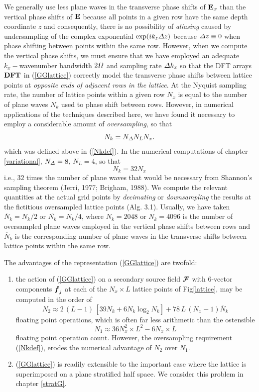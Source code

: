 We generally use less plane waves in the transverse phase shifts of ${\bf E}_{x}$
than the vertical phase shifts of ${\bf E}$ because all points in a 
given row have the same depth coordinate $z$ and consequently, there is no possibility of 
{\em aliasing\/}
caused by 
undersampling of the complex exponential $\exp (i k_z {\mit \Delta}z)$ 
because ${\mit \Delta}z\equiv 0$ when phase shifting between points 
within the same row. However, when we compute the vertical phase shifts, 
we must ensure that we have employed an adequate $k_x-$wavenumber 
bandwidth $2 {\mit \Omega}$ and sampling rate ${\mit \Delta}k_x$ so that the DFT arrays 
${\bf DFT}$ in (\ref{GGlattice}) correctly model the transverse phase shifts between 
lattice points at {\em opposite ends  of  adjacent rows in the 
lattice\/}. 
At the Nyquist sampling rate, the number of lattice points within a given 
row $N_x$ is equal to the number of plane waves $N_k$ used to phase shift between 
rows.
 However, in numerical applications of the techniques described 
here, we have found it necessary to employ a considerable amount of 
{\em oversampling\/}, so that
\[
N_k = {N}_{\mit \Delta } {N}_{L } N_x.
\]
which was defined above in (\ref{Nkdef}). In the numerical computations 
of chapter \ref{variational}, ${N}_{\mit \Delta }=8$, ${N}_{L }=4$, so that
\[
N_k = 32  N_x
\]
i.e., $32$ times the number of plane 
waves that would be necessary from Shannon's sampling theorem (Jerri, 1977; Brigham, 1988). 
We compute 
the relevant quantities at the actual grid points by {\em decimating\/} 
or {\em downsampling\/} 
the results at the fictitious oversampled lattice points (Alg. 3.1).
Usually, we have taken $\overline{N}_k=N_k/2$ or $\overline{N_k}=N_k/4$, where 
$N_k=2048$ or $N_k=4096$ is the number of oversampled plane waves 
employed in the vertical phase shifts between rows and $\overline{N}_k$ is the 
corresponding number of plane waves in the transverse shifts between 
lattice points within the same row.

The advantages of the representation (\ref{GGlattice}) are twofold:
\begin{enumerate}
\item the action of (\ref{GGlattice}) on a secondary source field 
${\mbox{\boldmath$\cal F$\unboldmath}}$ with $6$-vector components ${\mbox{\boldmath$\mit f$\unboldmath}}_j$ at each of the $N_x\times L$ lattice 
points of Fig\ref{lattice},  may be computed in the order of 
\[
N_2\approx2\,(L-1)\,\left[ 39 N_k + 6 N_k \log_2 N_k \right]+ 
78\,L\,(N_x-1)  \overline{N}_k
\]
floating point operations, which is often  far less arithmetic than 
the ostensible 
\[
N_1\approx36 N_x^2 \times L^2 - 6 N_x \times L
\]
 floating point operation count. However,  the oversampling requirement
 (\ref{Nkdef}),
 erodes the numerical advantage of $N_2$ over $N_1$.  
\item  (\ref{GGlattice}) is readily extensible to 
the important case where the lattice is superimposed on a plane 
stratified half space. We consider this problem in chapter \ref{stratG}.
\end{enumerate} 


